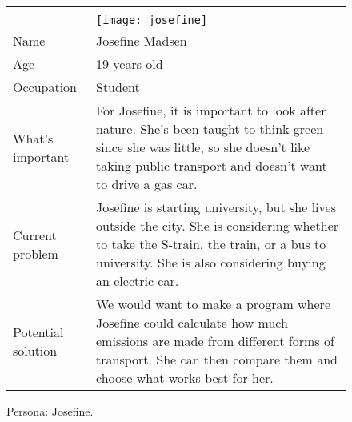 \noindent
\begin{figure}[H]
    \centering
    \begin{tabularx}{\textwidth}{ | l X | }
        \hline
        &                                                  \\
        & \texttt{[image: josefine]} \\
        Name       & Josefine Madsen                                  \\
        Age        & 19 years old                                     \\
        Occupation & Student                                          \\
        What's important & For Josefine, it is important to look after nature.
        She's been taught to think green since she was little, so she doesn't like taking public transport and doesn't want
        to drive a gas car. \\
        Current problem & Josefine is starting university, but she lives outside the city.
        She is considering whether to take the S-train, the train, or a bus to university.
        She is also considering buying an electric car. \\
        Potential solution & We would want to make a program where Josefine could calculate how much emissions are
        made from different forms of transport.
        She can then compare them and choose what works best for her. \\
        \hline
    \end{tabularx}
    \caption{Persona: Josefine.}
    \label{fig:persona_josefine}
\end{figure}

